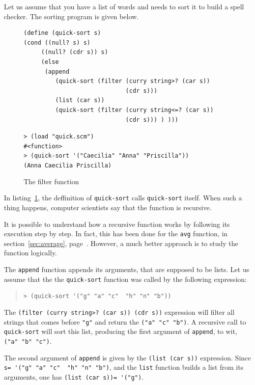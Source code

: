 \documentclass[a4paper,12pt]{book}
\newenvironment{fmpage}[1]
           {\begin{lrbox}{\fmbox}\begin{minipage}{#1}}
           {\end{minipage}\end{lrbox}\fbox{\usebox{\fmbox}}}
\begin{document}
Let us assume that you have a list
of words and needs to sort it
to build a spell checker. The sorting
program is given below.



\begin{figure}[!h]
\begin{fmpage}{\linewidth}
\begin{verbatim}
(define (quick-sort s)
(cond ((null? s) s)
     ((null? (cdr s)) s)
     (else 
      (append 
         (quick-sort (filter (curry string>? (car s)) 
                             (cdr s)))
         (list (car s))
         (quick-sort (filter (curry string<=? (car s))
                             (cdr s))) ) )))
\end{verbatim}
\end{fmpage}

\begin{fmpage}{\linewidth}
\verb|> (load "quick.scm")|\\
\verb|#<function>|\\
\verb|> (quick-sort '("Caecilia" "Anna" "Priscilla"))|\\
\verb|(Anna Caecilia Priscilla)|
\end{fmpage}
\caption{The filter function}
\label{fig:filter}
\end{figure}

In listing~\ref{fig:filter}, the deffinition of
\verb|quick-sort| calls \verb|quick-sort| itself.
When such a thing happens, computer scientists
say that the function is recursive.

It is possible to understand how a recursive
function works by following its execution
step by step. In fact, this has been done
for the \verb|avg| function, in section~\ref{sec:average},
page~\pageref{sec:average}. However, a much
better approach is to study the function logically.

The \verb|append| function appends its
arguments, that are supposed to be lists.
Let us assume that the the \verb|quick-sort|
function was called by the following expression:
\begin{quote}
\verb|> (quick-sort '("g" "a" "c"  "h" "n" "b"))|
\end{quote}
The \verb|(filter (curry string>? (car s)) (cdr s))|
expression will filter all strings that comes before
\verb|"g"| and return the \verb|("a" "c" "b")|.
A recursive call to \verb|quick-sort| will
sort this list, producing the first argument
of \verb|append|, to wit, \verb|("a" "b" "c")|.

The second argument of \verb|append| is
given by the \verb|(list (car s))| expression.
Since \verb|s= '("g" "a" "c"  "h" "n" "b")|,
and the \verb|list| function builds a list
from its arguments, one
has \verb|(list (car s))= '("g")|.
\end{document}

